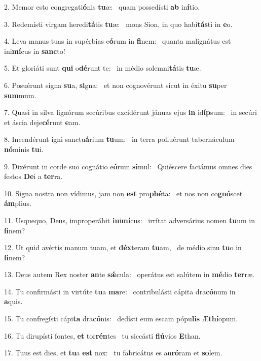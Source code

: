 2. Memor esto congregati\textbf{ó}nis \textbf{tu}æ: \ast\  quam possedísti \textbf{ab} in\textbf{í}tio.\

3. Redemísti virgam heredi\textbf{tá}tis \textbf{tu}æ: \ast\  mons Sion, in quo habi\textbf{tás}ti in \textbf{e}o.\

4. Leva manus tuas in supérbias e\textbf{ó}rum in \textbf{fi}nem: \ast\  quanta malignátus est ini\textbf{mí}cus in \textbf{sanc}to!\

5. Et gloriáti sunt \textbf{qui} o\textbf{dé}runt te: \ast\  in médio solemni\textbf{tá}tis \textbf{tu}æ.\

6. Posuérunt signa \textbf{su}a, \textbf{si}gna: \ast\  et non cognovérunt sicut in éxitu \textbf{su}per \textbf{sum}mum.\

7. Quasi in silva lignórum secúribus excidérunt jánuas ejus \textbf{in} id\textbf{íp}sum: \ast\  in secúri et áscia deje\textbf{cé}runt \textbf{e}am.\

8. Incendérunt igni sanctu\textbf{á}rium \textbf{tu}um: \ast\  in terra polluérunt tabernáculum \textbf{nó}minis \textbf{tu}i.\

9. Dixérunt in corde suo cognátio e\textbf{ó}rum \textbf{si}mul: \ast\  Quiéscere faciámus omnes dies festos \textbf{De}i a \textbf{ter}ra.\

10. Signa nostra non vídimus, jam non \textbf{est} pro\textbf{phé}ta: \ast\  et nos non co\textbf{gnó}scet \textbf{ám}plius.\

11. Usquequo, Deus, improperábit \textbf{in}i\textbf{mí}cus: \ast\  irrítat adversárius nomen \textbf{tu}um in \textbf{fi}nem?\

12. Ut quid avértis manum tuam, et \textbf{déx}teram \textbf{tu}am, \ast\  de médio sinu \textbf{tu}o in \textbf{fi}nem?\

13. Deus autem Rex noster \textbf{an}te \textbf{sǽ}cula: \ast\  operátus est salútem in \textbf{mé}dio \textbf{ter}ræ.\

14. Tu confirmásti in virtúte \textbf{tu}a \textbf{ma}re: \ast\  contribulásti cápita dra\textbf{có}num in \textbf{a}quis.\

15. Tu confregísti cápi\textbf{ta} dra\textbf{có}nis: \ast\  dedísti eum escam pópu\textbf{lis} Æ\textbf{thí}opum.\

16. Tu dirupísti fontes, \textbf{et} tor\textbf{rén}tes \ast\  tu siccásti \textbf{flú}vios \textbf{E}than.\

17. Tuus est dies, et \textbf{tu}a \textbf{est} nox: \ast\  tu fabricátus es au\textbf{ró}ram et \textbf{so}lem.\

